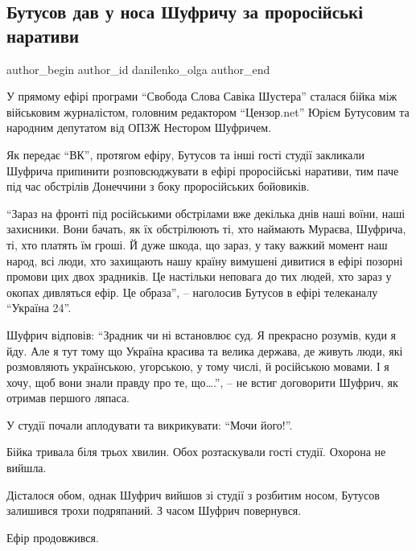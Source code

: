  
 
 
 
 
 
\subsection{Бутусов дав у носа Шуфричу за проросійські наративи}
\label{sec:19_02_2022.stz.kiev.bigkyiv.2.butusov_shufrich_draka}
 
\ifcmt
 author_begin
   author_id danilenko_olga
 author_end
\fi

У прямому ефірі програми \enquote{Свобода Слова Савіка Шустера} сталася бійка між
військовим журналістом, головним редактором \enquote{Цензор.net} Юрієм Бутусовим та
народним депутатом від ОПЗЖ Нестором Шуфричем.


Як передає \enquote{ВК},  протягом ефіру, Бутусов та інші гості студії закликали
Шуфрича припинити розповсюджувати в ефірі проросійські наративи, тим паче під
час обстрілів Донеччини з боку проросійських бойовиків.

\enquote{Зараз на фронті під російськими обстрілами вже декілька днів наші воїни, наші
захисники. Вони бачать, як їх обстрілюють ті, хто наймають Мураєва, Шуфрича,
ті, хто платять їм гроші. Й дуже шкода, що зараз, у таку важкий момент наш
народ, всі люди, хто захищають нашу країну вимушені дивитися в ефірі позорні
промови цих двох зрадників. Це настільки неповага до тих людей, хто зараз у
окопах дивляться ефір. Це образа}, – наголосив Бутусов в ефірі телеканалу
\enquote{Україна 24}.

Шуфрич відповів: \enquote{Зрадник чи ні встановлює суд. Я прекрасно розумів, куди я
йду. Але я тут тому що Україна красива та велика держава, де живуть люди, які
розмовляють українською, угорською, у тому числі, й російською мовами. І я
хочу, щоб вони знали правду про те, що….}, – не встиг договорити Шуфрич, як
отримав першого ляпаса.

У студії почали аплодувати та викрикувати: \enquote{Мочи його!}.

Бійка тривала біля трьох хвилин. Обох розтаскували гості студії. Охорона не
вийшла.

Дісталося обом, однак Шуфрич вийшов зі студії з розбитим носом, Бутусов
залишився трохи подряпаний. З часом Шуфрич повернувся. 

Ефір продовжився. 
